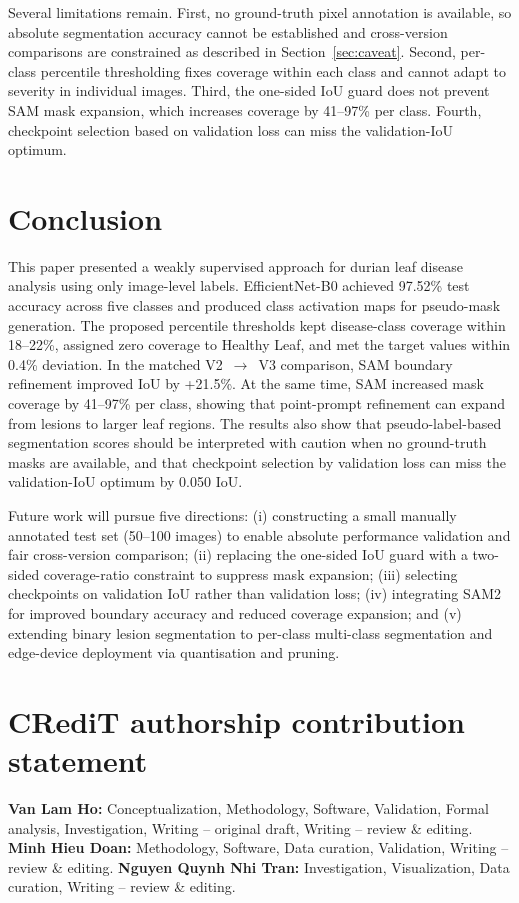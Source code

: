 \documentclass[final,5p,times,twocolumn,authoryear]{elsarticle}
\begin{document}
Several limitations remain. First, no ground-truth pixel annotation is available, so absolute segmentation accuracy cannot be established and cross-version comparisons are constrained as described in Section~\ref{sec:caveat}. Second, per-class percentile thresholding fixes coverage within each class and cannot adapt to severity in individual images. Third, the one-sided IoU guard does not prevent SAM mask expansion, which increases coverage by 41--97\% per class. Fourth, checkpoint selection based on validation loss can miss the validation-IoU optimum.

\FloatBarrier
\section{Conclusion}
\label{sec:conclusion}

This paper presented a weakly supervised approach for durian leaf disease analysis using only image-level labels. EfficientNet-B0 achieved 97.52\% test accuracy across five classes and produced class activation maps for pseudo-mask generation. The proposed percentile thresholds kept disease-class coverage within 18--22\%, assigned zero coverage to Healthy Leaf, and met the target values within 0.4\% deviation. In the matched V2~$\to$~V3 comparison, SAM boundary refinement improved IoU by +21.5\%. At the same time, SAM increased mask coverage by 41--97\% per class, showing that point-prompt refinement can expand from lesions to larger leaf regions. The results also show that pseudo-label-based segmentation scores should be interpreted with caution when no ground-truth masks are available, and that checkpoint selection by validation loss can miss the validation-IoU optimum by 0.050 IoU.

Future work will pursue five directions: (i) constructing a small manually annotated test set (50--100 images) to enable absolute performance validation and fair cross-version comparison; (ii) replacing the one-sided IoU guard with a two-sided coverage-ratio constraint to suppress mask expansion; (iii) selecting checkpoints on validation IoU rather than validation loss; (iv) integrating SAM2 for improved boundary accuracy and reduced coverage expansion; and (v) extending binary lesion segmentation to per-class multi-class segmentation and edge-device deployment via quantisation and pruning.

\section*{CRediT authorship contribution statement}
\noindent\textbf{Van Lam Ho:} Conceptualization, Methodology, Software, Validation, Formal analysis, Investigation, Writing -- original draft, Writing -- review \& editing. \textbf{Minh Hieu Doan:} Methodology, Software, Data curation, Validation, Writing -- review \& editing. \textbf{Nguyen Quynh Nhi Tran:} Investigation, Visualization, Data curation, Writing -- review \& editing.
\end{document}
